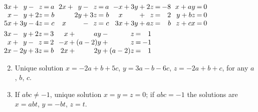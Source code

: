 \begin{multicols}{2}
\begin{ex}
\begin{exenumerate}
\exitem %
$\arraycolsep=1pt
\begin{array}[t]{rlrlrcr}
	3x & + & y & - &  z & = & a \\
	 x & - & y & + & 2z & = & b \\
	5x & + & 3y & - & 4z & = & c
\end{array}$
\exitem %
$\arraycolsep=1pt
\begin{array}[t]{rlrlrcr}
	2x & + & y & - & z & = & a \\
	   &   &2y & + & 3z & = & b \\
	 x &   &   & - &  z & = & c
\end{array}$
\exitem %
$\arraycolsep=1pt
\begin{array}[t]{rlrlrcr}
	-x & + & 3y & + & 2z & = & -8 \\
	 x &   &    & + &  z & = & 2 \\
	3x & + & 3y & + & az & = & b
\end{array}$
\exitem %
$\arraycolsep=1pt
\begin{array}[t]{rcr}
	x + ay & = & 0 \\
	y + bz & = & 0 \\
	z + cx & = & 0
\end{array}$
\exitem* %
$\arraycolsep=1pt
\begin{array}[t]{rlrlrcr}
	3x & - & y & + & 2z & = & 3 \\
	 x & + & y & - &  z & = & 2 \\
	2x & - &2y & + & 3z & = & b
\end{array}$
\exitem* %
$\arraycolsep=1pt
\begin{array}[t]{rlrlrcr}
	 x & + & ay & - & z & = & 1 \\
	-x & + &(a - 2)y & + & z & = & -1 \\
	2x & + & 2y & + & (a - 2)z & = & 1
\end{array}$
\end{exenumerate}

\begin{sol}
\begin{enumerate}[label={\alph*.}]
\setcounter{enumi}{1}
\item  Unique solution $x = -2a + b + 5c$, \newline $y = 3a - b - 6c$, $z = -2a + b + c $, for any $a$, $b$, $c$.

\setcounter{enumi}{3}
\item  If $abc \neq -1$, unique solution $ x = y = z = 0 $; if $abc = -1$ the solutions are $x = abt$, $y = -bt$, $z = t$.


\end{enumerate}
\end{sol}
\end{ex}
\end{multicols}
